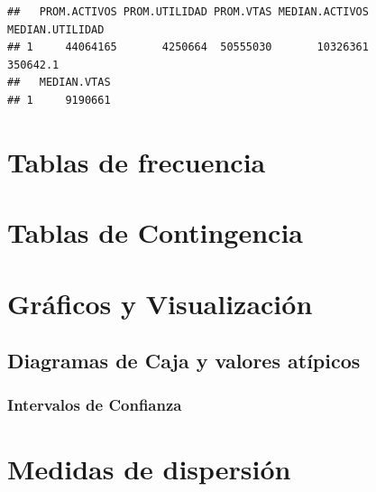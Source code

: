 \documentclass[]{book}
\newenvironment{Shaded}{\begin{snugshade}}{\end{snugshade}}
\newcommand{\KeywordTok}[1]{\textcolor[rgb]{0.13,0.29,0.53}{\textbf{#1}}}
\newcommand{\DataTypeTok}[1]{\textcolor[rgb]{0.13,0.29,0.53}{#1}}
\newcommand{\StringTok}[1]{\textcolor[rgb]{0.31,0.60,0.02}{#1}}
\newcommand{\OperatorTok}[1]{\textcolor[rgb]{0.81,0.36,0.00}{\textbf{#1}}}
\newcommand{\NormalTok}[1]{#1}
\begin{document}
\begin{Shaded}
\end{Shaded}

\begin{verbatim}
##   PROM.ACTIVOS PROM.UTILIDAD PROM.VTAS MEDIAN.ACTIVOS MEDIAN.UTILIDAD
## 1     44064165       4250664  50555030       10326361        350642.1
##   MEDIAN.VTAS
## 1     9190661
\end{verbatim}

\section{Tablas de frecuencia}\label{tablas-de-frecuencia}

\section{Tablas de Contingencia}\label{tablas-de-contingencia}

\section{Gráficos y Visualización}\label{graficos-y-visualizacion}

\subsection{Diagramas de Caja y valores
atípicos}\label{diagramas-de-caja-y-valores-atipicos}

\subsubsection{Intervalos de Confianza}\label{intervalos-de-confianza}

\section{Medidas de dispersión}\label{medidas-de-dispersion}
\end{document}
